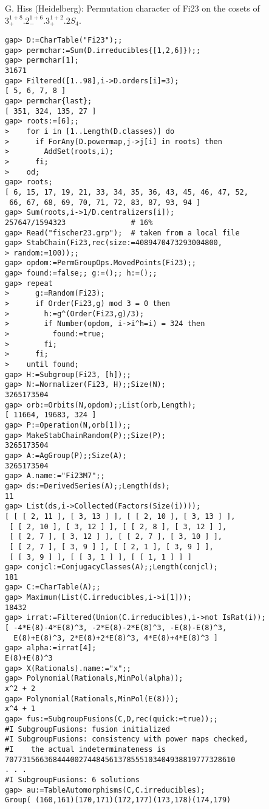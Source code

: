 \documentclass{article}
\begin{document}
\noindent
G. Hiss (Heidelberg): Permutation character of Fi23 on the cosets of 
$3_{+}^{1+8}.2_{-}^{1+6}.3_{+}^{1+2}.2S_4$.
\begin{verbatim}
gap> D:=CharTable("Fi23");;
gap> permchar:=Sum(D.irreducibles{[1,2,6]});;
gap> permchar[1];
31671
gap> Filtered([1..98],i->D.orders[i]=3);
[ 5, 6, 7, 8 ]
gap> permchar{last};
[ 351, 324, 135, 27 ]
gap> roots:=[6];;
>    for i in [1..Length(D.classes)] do
>      if ForAny(D.powermap,j->j[i] in roots) then
>        AddSet(roots,i);
>      fi;
>    od;
gap> roots;
[ 6, 15, 17, 19, 21, 33, 34, 35, 36, 43, 45, 46, 47, 52, 
 66, 67, 68, 69, 70, 71, 72, 83, 87, 93, 94 ]
gap> Sum(roots,i->1/D.centralizers[i]);
257647/1594323               # 16%
gap> Read("fischer23.grp");  # taken from a local file
gap> StabChain(Fi23,rec(size:=4089470473293004800,
> random:=100));;
gap> opdom:=PermGroupOps.MovedPoints(Fi23);;
gap> found:=false;; g:=();; h:=();;
gap> repeat
>      g:=Random(Fi23);
>      if Order(Fi23,g) mod 3 = 0 then
>        h:=g^(Order(Fi23,g)/3);
>        if Number(opdom, i->i^h=i) = 324 then
>          found:=true;
>        fi;
>      fi;
>    until found;
gap> H:=Subgroup(Fi23, [h]);;
gap> N:=Normalizer(Fi23, H);;Size(N);
3265173504
gap> orb:=Orbits(N,opdom);;List(orb,Length);
[ 11664, 19683, 324 ]
gap> P:=Operation(N,orb[1]);;
gap> MakeStabChainRandom(P);;Size(P);
3265173504
gap> A:=AgGroup(P);;Size(A);
3265173504
gap> A.name:="Fi23M7";;
gap> ds:=DerivedSeries(A);;Length(ds);
11
gap> List(ds,i->Collected(Factors(Size(i))));
[ [ [ 2, 11 ], [ 3, 13 ] ], [ [ 2, 10 ], [ 3, 13 ] ], 
 [ [ 2, 10 ], [ 3, 12 ] ], [ [ 2, 8 ], [ 3, 12 ] ], 
 [ [ 2, 7 ], [ 3, 12 ] ], [ [ 2, 7 ], [ 3, 10 ] ],
 [ [ 2, 7 ], [ 3, 9 ] ], [ [ 2, 1 ], [ 3, 9 ] ], 
 [ [ 3, 9 ] ], [ [ 3, 1 ] ], [ [ 1, 1 ] ] ]
gap> conjcl:=ConjugacyClasses(A);;Length(conjcl);
181
gap> C:=CharTable(A);;
gap> Maximum(List(C.irreducibles,i->i[1]));
18432
gap> irrat:=Filtered(Union(C.irreducibles),i->not IsRat(i));
[ -4*E(8)-4*E(8)^3, -2*E(8)-2*E(8)^3, -E(8)-E(8)^3,
  E(8)+E(8)^3, 2*E(8)+2*E(8)^3, 4*E(8)+4*E(8)^3 ]
gap> alpha:=irrat[4];
E(8)+E(8)^3
gap> X(Rationals).name:="x";;
gap> Polynomial(Rationals,MinPol(alpha));
x^2 + 2
gap> Polynomial(Rationals,MinPol(E(8)));
x^4 + 1
gap> fus:=SubgroupFusions(C,D,rec(quick:=true));;
#I SubgroupFusions: fusion initialized
#I SubgroupFusions: consistency with power maps checked,
#I    the actual indeterminateness is 
70773156636844400274484561378555103404938819777328610
. . .
#I SubgroupFusions: 6 solutions
gap> au:=TableAutomorphisms(C,C.irreducibles);
Group( (160,161)(170,171)(172,177)(173,178)(174,179)

\end{verbatim}
\end{document}
